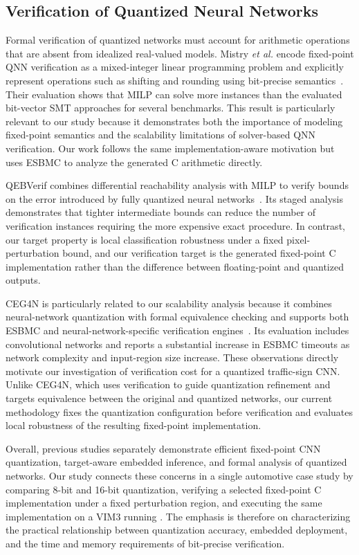 \subsection{Verification of Quantized Neural Networks}

Formal verification of quantized networks must account for arithmetic operations that are absent from idealized real-valued models. Mistry \emph{et al.} encode fixed-point QNN verification as a mixed-integer linear programming problem and explicitly represent operations such as shifting and rounding using bit-precise semantics~\cite{Mistry2022MILP}. Their evaluation shows that MILP can solve more instances than the evaluated bit-vector SMT approaches for several benchmarks. This result is particularly relevant to our study because it demonstrates both the importance of modeling fixed-point semantics and the scalability limitations of solver-based QNN verification. Our work follows the same implementation-aware motivation but uses ESBMC to analyze the generated C arithmetic directly.

QEBVerif combines differential reachability analysis with MILP to verify bounds on the error introduced by fully quantized neural networks~\cite{Zhang2023QEBVerif}. Its staged analysis demonstrates that tighter intermediate bounds can reduce the number of verification instances requiring the more expensive exact procedure. In contrast, our target property is local classification robustness under a fixed pixel-perturbation bound, and our verification target is the generated fixed-point C implementation rather than the difference between floating-point and quantized outputs.

CEG4N is particularly related to our scalability analysis because it combines neural-network quantization with formal equivalence checking and supports both ESBMC and neural-network-specific verification engines~\cite{Matos2022CEG4N}. Its evaluation includes convolutional networks and reports a substantial increase in ESBMC timeouts as network complexity and input-region size increase. These observations directly motivate our investigation of verification cost for a quantized traffic-sign CNN. Unlike CEG4N, which uses verification to guide quantization refinement and targets equivalence between the original and quantized networks, our current methodology fixes the quantization configuration before verification and evaluates local robustness of the resulting fixed-point implementation.

Overall, previous studies separately demonstrate efficient fixed-point CNN quantization, target-aware embedded inference, and formal analysis of quantized networks. Our study connects these concerns in a single automotive case study by comparing 8-bit and 16-bit quantization, verifying a selected fixed-point C implementation under a fixed perturbation region, and executing the same implementation on a VIM3 running \AAOS{}. The emphasis is therefore on characterizing the practical relationship between quantization accuracy, embedded deployment, and the time and memory requirements of bit-precise verification.

